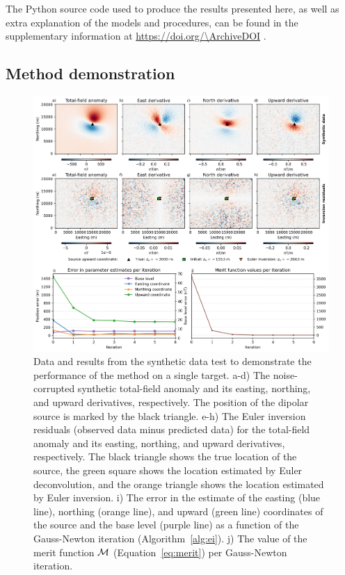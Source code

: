 \noindent
The Python source code used to produce the results presented here, as well as extra explanation of the models and procedures, can be found in the supplementary information at \url{https://doi.org/\ArchiveDOI} \citep{figshare}.


\subsection{Method demonstration}
\label{sec:proof}

\begin{figure}[tb!]
\centering
\includegraphics[width=1\linewidth]{figures/synthetic-proof-of-concept.png}
\caption{
    Data and results from the synthetic data test to demonstrate the performance of the method on a single target.
    a-d) The noise-corrupted synthetic total-field anomaly and its easting, northing, and upward derivatives, respectively. The position of the dipolar source is marked by the black triangle.
    e-h) The Euler inversion residuals (observed data minus predicted data) for the total-field anomaly and its easting, northing, and upward derivatives, respectively. The black triangle shows the true location of the source, the green square shows the location estimated by Euler deconvolution, and the orange triangle shows the location estimated by Euler inversion.
    i) The error in the estimate of the easting (blue line), northing (orange line), and upward (green line) coordinates of the source and the base level (purple line) as a function of the Gauss-Newton iteration (Algorithm~\ref{alg:ei}).
    j) The value of the merit function $\operatorname{\mathcal{M}}$ (Equation~\ref{eq:merit}) per Gauss-Newton iteration.
}
\label{fig:proof}
\end{figure}

